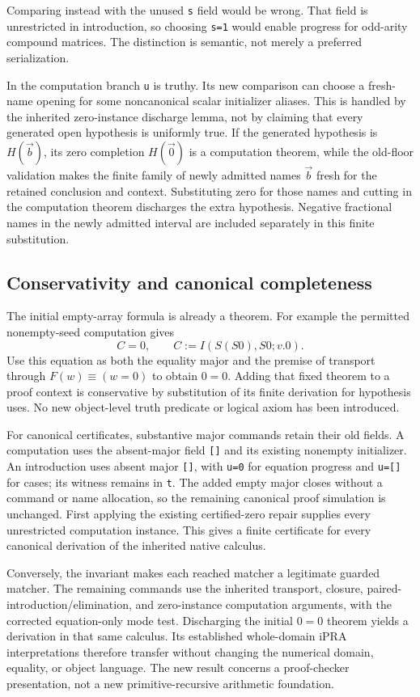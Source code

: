 \documentclass[11pt,letterpaper]{article}
\theoremstyle{definition}\newtheorem{definition}[theorem]{Definition}
\theoremstyle{remark}\newtheorem{remark}[theorem]{Remark}
\begin{document}
Comparing instead with the unused \texttt{s} field would be wrong.
That field is unrestricted in introduction, so choosing
\texttt{s=1} would enable progress for odd-arity compound matrices.
The distinction is semantic, not merely a preferred serialization.

In the computation branch \texttt{u} is truthy.  Its new comparison can
choose a fresh-name opening for some noncanonical scalar initializer
aliases.  This is handled by the inherited zero-instance discharge
lemma, not by claiming that every generated open hypothesis is
uniformly true.  If the generated hypothesis is $H(\vec b)$, its zero
completion $H(\vec0)$ is a computation theorem, while the old-floor
validation makes the finite family of newly admitted names $\vec b$
fresh for the retained conclusion and context.  Substituting zero for
those names and cutting in the computation theorem discharges the
extra hypothesis.  Negative fractional names in the newly admitted
interval are included separately in this finite substitution.

\subsection{Conservativity and canonical completeness}

The initial empty-array formula is already a theorem.  For example the
permitted nonempty-seed computation gives
\[
 C=0,\qquad C:=I(S(S0),S0;v.0).
\]
Use this equation as both the equality major and the premise of
transport through $F(w)\equiv(w=0)$ to obtain $0=0$.  Adding that fixed
theorem to a proof context is conservative by substitution of its
finite derivation for hypothesis uses.  No new object-level truth
predicate or logical axiom has been introduced.

For canonical certificates, substantive major commands retain their
old fields.  A computation uses the absent-major field \texttt{[]} and
its existing nonempty initializer.  An introduction uses absent major
\texttt{[]}, with \texttt{u=0} for equation progress and
\texttt{u=[]} for cases; its witness remains in \texttt{t}.
The added empty major closes without a command or name allocation, so
the remaining canonical proof simulation is unchanged.  First applying
the existing certified-zero repair supplies every unrestricted
computation instance.  This gives a finite certificate for every
canonical derivation of the inherited native calculus.

Conversely, the invariant makes each reached matcher a legitimate
guarded matcher.  The remaining commands use the inherited
transport, closure, paired-introduction/elimination, and zero-instance
computation arguments, with the corrected equation-only mode test.
Discharging the initial $0=0$ theorem yields a derivation in that same
calculus.  Its established whole-domain iPRA interpretations therefore
transfer without changing the numerical domain, equality, or object
language.  The new result concerns a proof-checker presentation, not a
new primitive-recursive arithmetic foundation.
\end{document}
